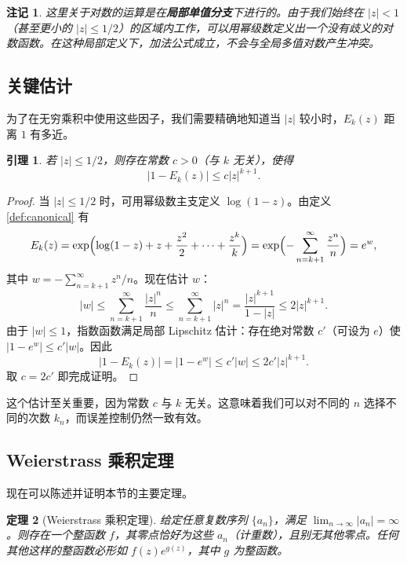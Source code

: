 \documentclass[UTF8]{ctexart}
\newtheorem{theorem}{定理}[section]
\newtheorem{lemma}[theorem]{引理}
\newtheorem{remark}{注记}[section]
\numberwithin{equation}{section}
\begin{document}
\begin{remark}
这里关于对数的运算是在\textbf{局部单值分支}下进行的。由于我们始终在 \(|z| < 1\)（甚至更小的 \(|z| \le 1/2\)）的区域内工作，可以用幂级数定义出一个没有歧义的对数函数。在这种局部定义下，加法公式成立，不会与全局多值对数产生冲突。
\end{remark}

\subsection{关键估计}

为了在无穷乘积中使用这些因子，我们需要精确地知道当 \(|z|\) 较小时，\(E_k(z)\) 距离 \(1\) 有多近。

\begin{lemma}\label{lem:canonical-est}
若 \(|z| \le 1/2\)，则存在常数 \(c > 0\)（与 \(k\) 无关），使得
\begin{equation}\label{eq:canonical-bound}
|1 - E_k(z)| \le c |z|^{k+1}.
\end{equation}
\end{lemma}

\begin{proof}
当 \(|z| \le 1/2\) 时，可用幂级数主支定义 \(\log(1 - z)\)。由定义 \ref{def:canonical} 有
\[
E_k(z) = \exp\Bigl( \log(1 - z) + z + \frac{z^2}{2} + \dots + \frac{z^k}{k} \Bigr)
= \exp\Bigl( -\sum_{n=k+1}^\infty \frac{z^n}{n} \Bigr) = e^w,
\]
其中 \(w = -\sum_{n=k+1}^\infty z^n/n\)。现在估计 \(w\)：
\[
|w| \le \sum_{n=k+1}^\infty \frac{|z|^n}{n} \le \sum_{n=k+1}^\infty |z|^n = \frac{|z|^{k+1}}{1 - |z|} \le 2|z|^{k+1}.
\]
由于 \(|w| \le 1\)，指数函数满足局部 Lipschitz 估计：存在绝对常数 \(c'\)（可设为 \(e\)）使 \(|1 - e^w| \le c' |w|\)。因此
\[
|1 - E_k(z)| = |1 - e^w| \le c' |w| \le 2c' |z|^{k+1}.
\]
取 \(c = 2c'\) 即完成证明。
\end{proof}

这个估计至关重要，因为常数 \(c\) 与 \(k\) 无关。这意味着我们可以对不同的 \(n\) 选择不同的次数 \(k_n\)，而误差控制仍然一致有效。

\subsection{Weierstrass 乘积定理}

现在可以陈述并证明本节的主要定理。

\begin{theorem}[Weierstrass 乘积定理]\label{thm:weierstrass}
给定任意复数序列 \(\{a_n\}\)，满足 \(\lim_{n\to\infty} |a_n| = \infty\)。则存在一个整函数 \(f\)，其零点恰好为这些 \(a_n\)（计重数），且别无其他零点。任何其他这样的整函数必形如 \(f(z) e^{g(z)}\)，其中 \(g\) 为整函数。
\end{theorem}
\end{document}
